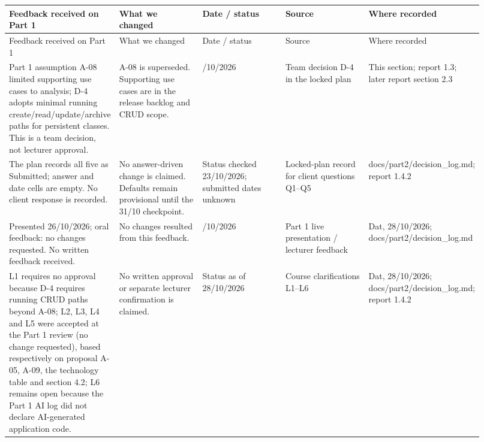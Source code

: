\begin{longtable}{>{\raggedright\arraybackslash}p{0.1840\linewidth}>{\raggedright\arraybackslash}p{0.1840\linewidth}>{\raggedright\arraybackslash}p{0.1840\linewidth}>{\raggedright\arraybackslash}p{0.1840\linewidth}>{\raggedright\arraybackslash}p{0.1840\linewidth}}
Feedback received on Part 1 & What we changed & Date / status & Source & Where recorded \\
\hline\endfirsthead
Feedback received on Part 1 & What we changed & Date / status & Source & Where recorded \\
\hline\endhead
Part 1 assumption A-08 limited supporting use cases to analysis; D-4 adopts minimal running create/read/update/archive paths for persistent classes. This is a team decision, not lecturer approval. & A-08 is superseded. Supporting use cases are in the release backlog and CRUD scope. & 23/10/2026 & Team decision D-4 in the locked plan & This section; report 1.3; later report section 2.3 \\
The plan records all five as Submitted; answer and date cells are empty. No client response is recorded. & No answer-driven change is claimed. Defaults remain provisional until the 31/10 checkpoint. & Status checked 23/10/2026; submitted dates unknown & Locked-plan record for client questions Q1--Q5 & docs/part2/decision\_log.md; report 1.4.2 \\
Presented 26/10/2026; oral feedback: no changes requested. No written feedback received. & No changes resulted from this feedback. & 26/10/2026 & Part 1 live presentation / lecturer feedback & Dat, 28/10/2026; docs/part2/decision\_log.md \\
L1 requires no approval because D-4 requires running CRUD paths beyond A-08; L2, L3, L4 and L5 were accepted at the Part 1 review (no change requested), based respectively on proposal A-05, A-09, the technology table and section 4.2; L6 remains open because the Part 1 AI log did not declare AI-generated application code. & No written approval or separate lecturer confirmation is claimed. & Status as of 28/10/2026 & Course clarifications L1--L6 & Dat, 28/10/2026; docs/part2/decision\_log.md; report 1.4.2 \\
\end{longtable}
